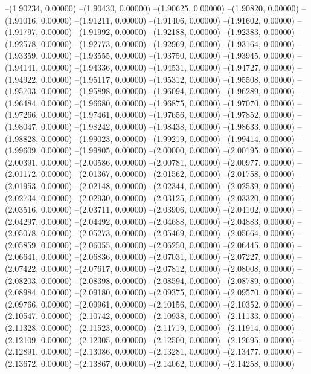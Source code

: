 --(1.90234, 0.00000)
--(1.90430, 0.00000)
--(1.90625, 0.00000)
--(1.90820, 0.00000)
--(1.91016, 0.00000)
--(1.91211, 0.00000)
--(1.91406, 0.00000)
--(1.91602, 0.00000)
--(1.91797, 0.00000)
--(1.91992, 0.00000)
--(1.92188, 0.00000)
--(1.92383, 0.00000)
--(1.92578, 0.00000)
--(1.92773, 0.00000)
--(1.92969, 0.00000)
--(1.93164, 0.00000)
--(1.93359, 0.00000)
--(1.93555, 0.00000)
--(1.93750, 0.00000)
--(1.93945, 0.00000)
--(1.94141, 0.00000)
--(1.94336, 0.00000)
--(1.94531, 0.00000)
--(1.94727, 0.00000)
--(1.94922, 0.00000)
--(1.95117, 0.00000)
--(1.95312, 0.00000)
--(1.95508, 0.00000)
--(1.95703, 0.00000)
--(1.95898, 0.00000)
--(1.96094, 0.00000)
--(1.96289, 0.00000)
--(1.96484, 0.00000)
--(1.96680, 0.00000)
--(1.96875, 0.00000)
--(1.97070, 0.00000)
--(1.97266, 0.00000)
--(1.97461, 0.00000)
--(1.97656, 0.00000)
--(1.97852, 0.00000)
--(1.98047, 0.00000)
--(1.98242, 0.00000)
--(1.98438, 0.00000)
--(1.98633, 0.00000)
--(1.98828, 0.00000)
--(1.99023, 0.00000)
--(1.99219, 0.00000)
--(1.99414, 0.00000)
--(1.99609, 0.00000)
--(1.99805, 0.00000)
--(2.00000, 0.00000)
--(2.00195, 0.00000)
--(2.00391, 0.00000)
--(2.00586, 0.00000)
--(2.00781, 0.00000)
--(2.00977, 0.00000)
--(2.01172, 0.00000)
--(2.01367, 0.00000)
--(2.01562, 0.00000)
--(2.01758, 0.00000)
--(2.01953, 0.00000)
--(2.02148, 0.00000)
--(2.02344, 0.00000)
--(2.02539, 0.00000)
--(2.02734, 0.00000)
--(2.02930, 0.00000)
--(2.03125, 0.00000)
--(2.03320, 0.00000)
--(2.03516, 0.00000)
--(2.03711, 0.00000)
--(2.03906, 0.00000)
--(2.04102, 0.00000)
--(2.04297, 0.00000)
--(2.04492, 0.00000)
--(2.04688, 0.00000)
--(2.04883, 0.00000)
--(2.05078, 0.00000)
--(2.05273, 0.00000)
--(2.05469, 0.00000)
--(2.05664, 0.00000)
--(2.05859, 0.00000)
--(2.06055, 0.00000)
--(2.06250, 0.00000)
--(2.06445, 0.00000)
--(2.06641, 0.00000)
--(2.06836, 0.00000)
--(2.07031, 0.00000)
--(2.07227, 0.00000)
--(2.07422, 0.00000)
--(2.07617, 0.00000)
--(2.07812, 0.00000)
--(2.08008, 0.00000)
--(2.08203, 0.00000)
--(2.08398, 0.00000)
--(2.08594, 0.00000)
--(2.08789, 0.00000)
--(2.08984, 0.00000)
--(2.09180, 0.00000)
--(2.09375, 0.00000)
--(2.09570, 0.00000)
--(2.09766, 0.00000)
--(2.09961, 0.00000)
--(2.10156, 0.00000)
--(2.10352, 0.00000)
--(2.10547, 0.00000)
--(2.10742, 0.00000)
--(2.10938, 0.00000)
--(2.11133, 0.00000)
--(2.11328, 0.00000)
--(2.11523, 0.00000)
--(2.11719, 0.00000)
--(2.11914, 0.00000)
--(2.12109, 0.00000)
--(2.12305, 0.00000)
--(2.12500, 0.00000)
--(2.12695, 0.00000)
--(2.12891, 0.00000)
--(2.13086, 0.00000)
--(2.13281, 0.00000)
--(2.13477, 0.00000)
--(2.13672, 0.00000)
--(2.13867, 0.00000)
--(2.14062, 0.00000)
--(2.14258, 0.00000)
